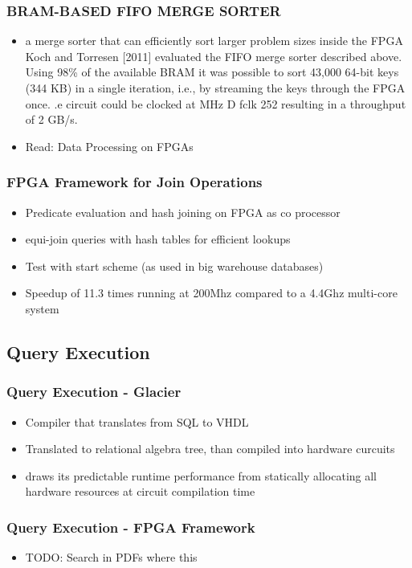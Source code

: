 \documentclass{beamer}
\begin{document}
\begin{frame}
\frametitle{BRAM-BASED FIFO MERGE SORTER}
\begin{itemize}
	\item a merge sorter that can efficiently sort larger problem sizes inside the FPGA
	Koch and Torresen [2011] evaluated the FIFO merge sorter described above. Using 98\% of the available BRAM it was possible to sort 43,000 64-bit keys (344 KB) in a single iteration, i.e., by streaming the keys through the FPGA once. .e circuit could be clocked at MHz D fclk 252 resulting in a throughput of 2 GB/s.
	\item Read: Data Processing on FPGAs
\end{itemize}
\end{frame}

\begin{frame}
	\frametitle{FPGA Framework for Join Operations}
	\begin{itemize}
		\item Predicate evaluation and hash joining on FPGA as co processor
		\item equi-join queries with hash tables for efficient lookups
		\item Test with start scheme (as used in big warehouse databases)
		\item Speedup of 11.3 times running at 200Mhz compared to a 4.4Ghz multi-core system
	\end{itemize}
\end{frame}

\subsection{Query Execution}
\begin{frame}
\frametitle{Query Execution - Glacier}
\begin{itemize}
	\item Compiler that translates from SQL to VHDL
	\item Translated to relational algebra tree, than compiled into hardware curcuits
	\item draws its predictable runtime performance from statically allocating all hardware resources at circuit compilation time
\end{itemize}
\end{frame}

\begin{frame}
	\frametitle{Query Execution - FPGA Framework}
	\begin{itemize}
		\item TODO: Search in PDFs where this 
	\end{itemize}
\end{frame}
\end{document}
